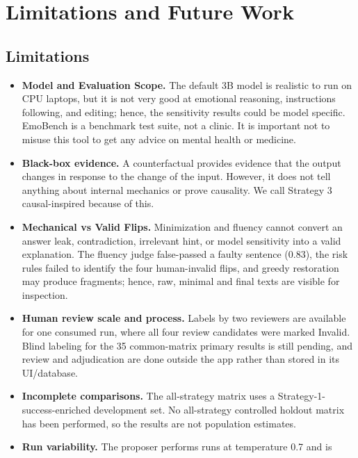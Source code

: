 \documentclass[11pt,a4paper]{article}
\begin{document}
\section{Limitations and Future Work}

\subsection{Limitations}

\begin{itemize}
  \item \textbf{Model and Evaluation Scope.} The default 3B model is realistic to run
  on CPU laptops, but it is not very good at emotional reasoning, instructions
  following, and editing; hence, the sensitivity results could be model specific.
  EmoBench is a benchmark test suite, not a clinic. It is important not to misuse this
  tool to get any advice on mental health or medicine.
  \item \textbf{Black-box evidence.} A counterfactual provides evidence that the output
  changes in response to the change of the input. However, it does not tell anything
  about internal mechanics or prove causality. We call Strategy 3 causal-inspired
  because of this.
  \item \textbf{Mechanical vs Valid Flips.} Minimization and fluency cannot convert an
  answer leak, contradiction, irrelevant hint, or model sensitivity into a valid
  explanation. The fluency judge false-passed a faulty sentence (0.83), the risk rules
  failed to identify the four human-invalid flips, and greedy restoration may produce
  fragments; hence, raw, minimal and final texts are visible for inspection.
  \item \textbf{Human review scale and process.} Labels by two reviewers are available
  for one consumed run, where all four review candidates were marked Invalid. Blind
  labeling for the 35 common-matrix primary results is still pending, and review and
  adjudication are done outside the app rather than stored in its UI/database.
  \item \textbf{Incomplete comparisons.} The all-strategy matrix uses a
  Strategy-1-success-enriched development set. No all-strategy controlled holdout
  matrix has been performed, so the results are not population estimates.
  \item \textbf{Run variability.} The proposer performs runs at temperature 0.7 and is

\end{itemize}
\end{document}
